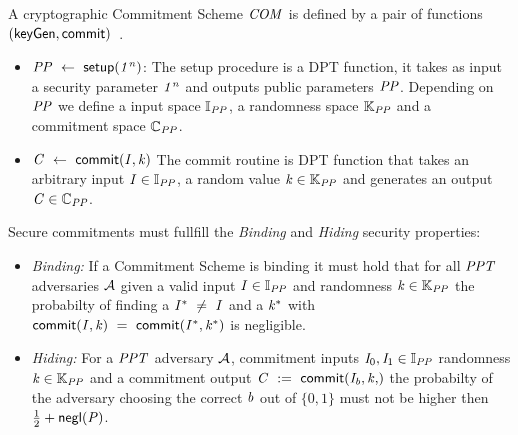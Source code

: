 \begin{definition}\label{def:pre:commitment}
    A cryptographic Commitment Scheme $\mathit{COM}$ is defined by a pair of functions $(\mathsf{keyGen}, \mathsf{commit})$~\cite{bunz2018bulletproofs}.
    \begin{itemize}
        \item $\mathit{PP} ~\leftarrow~ \mathsf{setup} (\mathit{1^n})$: The setup procedure is a DPT function, it takes as input a security parameter $\mathit{1^n}$ and outputs public parameters $\mathit{PP}$.
        Depending on $\mathit{PP}$ we define a input space $\mathbb{I}_{\mathit{PP}}$, a randomness space $\mathbb{K}_{\mathit{PP}}$ and a commitment space $\mathbb{C}_{\mathit{PP}}$.
        \item $\mathit{C} ~\leftarrow~ \mathsf{commit}(\mathit{I}, \mathit{k})$ The commit routine is DPT function that takes an arbitrary input $\mathit{I} \in \mathbb{I}_{\mathit{PP}}$, a random value $\mathit{k} \in \mathbb{K}_{\mathit{PP}}$ and
        generates an output $\mathit{C} \in \mathbb{C}_{\mathit{PP}}$.
    \end{itemize}

    Secure commitments must fullfill the \emph{Binding} and \emph{Hiding} security properties:
    \begin{itemize}
        \item \textit{Binding:} If a Commitment Scheme is binding it must hold that for all $\mathit{PPT}$ adversaries $\mathcal{A}$ given a valid input $\mathit{I} \in \mathbb{I}_{\mathit{PP}}$
        and randomness $\mathit{k} \in \mathbb{K}_{\mathit{PP}}$ the probabilty of finding a $\mathit{I}^* ~\neq~ \mathit{I}$ and a $\mathit{k}^*$ with
        $\mathsf{commit}(\mathit{I}, \mathit{k}) ~=~ \mathsf{commit}(\mathit{I}^*, \mathit{k}^*)$ is negligible.
        \item \textit{Hiding:} For a $\mathit{PPT}$ adversary $\mathcal{A}$, commitment inputs $\mathit{I}_0, \mathit{I}_1 \in \mathbb{I}_{\mathit{PP}}$ randomness $\mathit{k} \in
       \mathbb{K}_{\mathit{PP}}$ and a commitment output $\varCommitment \opAssign \procCommit{\varInput_{\varB}, \varNonce}$ the probabilty of the adversary choosing the correct $\mathit{b}$ out of $\{0,1\}$
        must not be higher then $\frac{1}{2} + \mathsf{negl}(\mathit{P})$.
    \end{itemize}
\end{definition}

